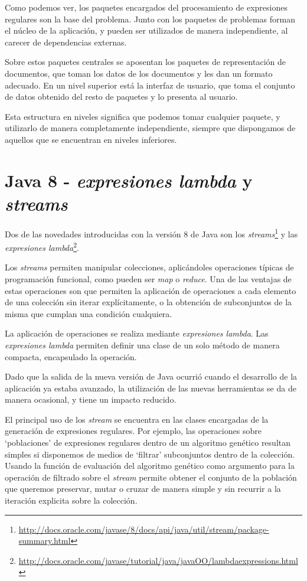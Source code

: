 
Como podemos ver, los paquetes encargados del procesamiento de expresiones regulares son la base del problema.
Junto con los paquetes de problemas forman el núcleo de la aplicación, y pueden ser utilizados de manera independiente, al carecer de dependencias externas.

Sobre estos paquetes centrales se aposentan los paquetes de representación de documentos, que toman los datos de los documentos y les dan un formato adecuado.
En un nivel superior está la interfaz de usuario, que toma el conjunto de datos obtenido del resto de paquetes y lo presenta al usuario.

Esta estructura en niveles significa que podemos tomar cualquier paquete, y utilizarlo de manera completamente independiente, siempre que dispongamos de aquellos que se encuentran en niveles inferiores.

\section{Java 8 - \emph{expresiones lambda} y \emph{streams}}
Dos de las novedades introducidas con la versión 8 de Java son los \emph{streams}\footnote{\url{http://docs.oracle.com/javase/8/docs/api/java/util/stream/package-summary.html}} y las \emph{expresiones lambda}\footnote{\url{http://docs.oracle.com/javase/tutorial/java/javaOO/lambdaexpressions.html}}.

Los \emph{streams} permiten manipular colecciones, aplicándoles operaciones típicas de programación funcional, como pueden ser \emph{map} o \emph{reduce}.
Una de las ventajas de estas operaciones son que permiten la aplicación de operaciones a cada elemento de una colección sin iterar explícitamente, o la obtención de subconjuntos de la misma que cumplan una condición cualquiera.

La aplicación de operaciones se realiza mediante \emph{expresiones lambda}.
Las \emph{expresiones lambda} permiten definir una clase de un solo método de manera compacta, encapsulado la operación.

Dado que la salida de la nueva versión de Java ocurrió cuando el desarrollo de la aplicación ya estaba avanzado, la utilización de las nuevas herramientas se da de manera ocasional, y tiene un impacto reducido.

El principal uso de los \emph{stream} se encuentra en las clases encargadas de la generación de expresiones regulares.
Por ejemplo, las operaciones sobre `poblaciones' de expresiones regulares dentro de un algoritmo genético resultan simples si disponemos de medios de `filtrar' subconjuntos dentro de la colección.
Usando la función de evaluación del algoritmo genético como argumento para la operación de filtrado sobre el \emph{stream} permite obtener el conjunto de la población que queremos preservar, mutar o cruzar de manera simple y sin recurrir a la iteración explicita sobre la colección.